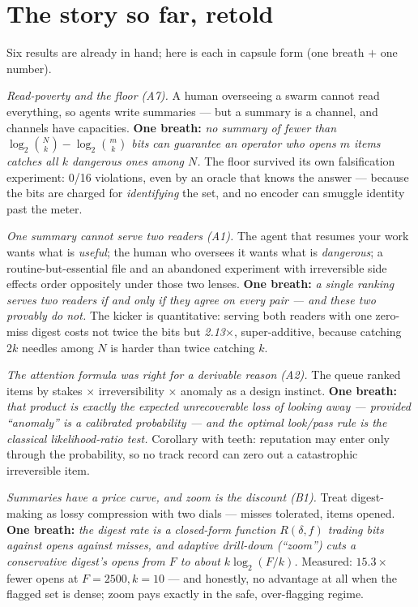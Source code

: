 \documentclass[11pt,a4paper]{article}
\begin{document}
\section{The story so far, retold}\label{sec:sofar}
Six results are already in hand; here is each in capsule form (one breath $+$ one number).

\emph{Read-poverty and the floor (A7).} A human overseeing a swarm cannot read everything, so agents write summaries --- but a summary is a channel, and channels have capacities. \textbf{One breath:} \emph{no summary of fewer than $\log_2\binom{N}{k}-\log_2\binom{m}{k}$ bits can guarantee an operator who opens $m$ items catches all $k$ dangerous ones among $N$.} The floor survived its own falsification experiment: 0/16 violations, even by an oracle that knows the answer --- because the bits are charged for \emph{identifying} the set, and no encoder can smuggle identity past the meter.

\emph{One summary cannot serve two readers (A1).} The agent that resumes your work wants what is \emph{useful}; the human who oversees it wants what is \emph{dangerous}; a routine-but-essential file and an abandoned experiment with irreversible side effects order oppositely under those two lenses. \textbf{One breath:} \emph{a single ranking serves two readers if and only if they agree on every pair --- and these two provably do not.} The kicker is quantitative: serving both readers with one zero-miss digest costs not twice the bits but \emph{2.13$\times$}, super-additive, because catching $2k$ needles among $N$ is harder than twice catching $k$.

\emph{The attention formula was right for a derivable reason (A2).} The queue ranked items by stakes $\times$ irreversibility $\times$ anomaly as a design instinct. \textbf{One breath:} \emph{that product is exactly the expected unrecoverable loss of looking away --- provided ``anomaly'' is a calibrated probability --- and the optimal look/pass rule is the classical likelihood-ratio test.} Corollary with teeth: reputation may enter only through the probability, so no track record can zero out a catastrophic irreversible item.

\emph{Summaries have a price curve, and zoom is the discount (B1).} Treat digest-making as lossy compression with two dials --- misses tolerated, items opened. \textbf{One breath:} \emph{the digest rate is a closed-form function $R(\delta,f)$ trading bits against opens against misses, and adaptive drill-down (``zoom'') cuts a conservative digest's opens from $F$ to about $k\log_2(F/k)$.} Measured: $15.3\times$ fewer opens at $F{=}2500, k{=}10$ --- and honestly, no advantage at all when the flagged set is dense; zoom pays exactly in the safe, over-flagging regime.
\end{document}
